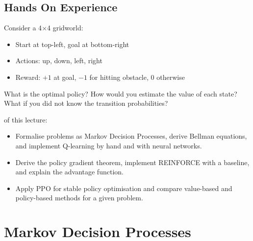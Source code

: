 \iffalse
\subsection{Hands On Experience}

\begin{marginfigure}
\caption{Gridworld: navigate from S to G, avoiding obstacles.}
\label{fig:gridworld}
\end{marginfigure}

Consider a 4$\times$4 gridworld:
\begin{itemize}
    \item Start at top-left, goal at bottom-right
    \item Actions: up, down, left, right
    \item Reward: $+1$ at goal, $-1$ for hitting obstacle, $0$ otherwise
\end{itemize}

What is the optimal policy? How would you estimate the value of each state? What if you did not know the transition probabilities?

 of this lecture:
\begin{itemize}
    \item Formalise problems as Markov Decision Processes, derive Bellman equations, and implement Q-learning by hand and with neural networks.
    \item Derive the policy gradient theorem, implement REINFORCE with a baseline, and explain the advantage function.
    \item Apply PPO for stable policy optimisation and compare value-based and policy-based methods for a given problem.
\end{itemize}


\newpage
\section{Markov Decision Processes}

